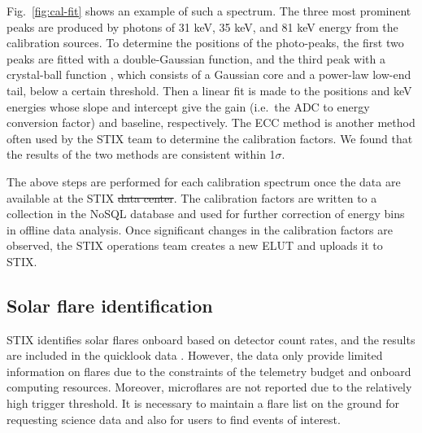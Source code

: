 \documentclass[referee]{aa} %
\providecommand{\DIFaddtex}[1]{{\protect\color{blue}\uwave{#1}}} %
\providecommand{\DIFdeltex}[1]{{\protect\color{red}\sout{#1}}}                      %
\providecommand{\DIFaddbegin}{} %
\providecommand{\DIFaddend}{} %
\providecommand{\DIFdelbegin}{} %
\providecommand{\DIFdelend}{} %
\providecommand{\DIFadd}[1]{\texorpdfstring{\DIFaddtex{#1}}{#1}} %
\providecommand{\DIFdel}[1]{\texorpdfstring{\DIFdeltex{#1}}{}} %
\newcommand{\DIFscaledelfig}{0.5}
\newlength{\DIFdelgraphicswidth} %
\newlength{\DIFdelgraphicsheight} %
\newcommand{\DIFaddincludegraphics}[2][]{{\color{blue}\fbox{\DIFOincludegraphics[#1]{#2}}}} %
\newcommand{\DIFdelincludegraphics}[2][]{%
\sbox{\DIFdelgraphicsbox}{\DIFOincludegraphics[#1]{#2}}%
\settoboxwidth{\DIFdelgraphicswidth}{\DIFdelgraphicsbox} %
\settoboxtotalheight{\DIFdelgraphicsheight}{\DIFdelgraphicsbox} %
\scalebox{\DIFscaledelfig}{%
\parbox[b]{\DIFdelgraphicswidth}{\usebox{\DIFdelgraphicsbox}\\[-\baselineskip] \rule{\DIFdelgraphicswidth}{0em}}\llap{\resizebox{\DIFdelgraphicswidth}{\DIFdelgraphicsheight}{%
\setlength{\unitlength}{\DIFdelgraphicswidth}%
\begin{picture}(1,1)%
\thicklines\linethickness{2pt} %
{\color[rgb]{1,0,0}\put(0,0){\framebox(1,1){}}}%
{\color[rgb]{1,0,0}\put(0,0){\line( 1,1){1}}}%
{\color[rgb]{1,0,0}\put(0,1){\line(1,-1){1}}}%
\end{picture}%
}\hspace*{3pt}}} %
} %
\DeclareRobustCommand{\DIFaddbegin}{\DIFOaddbegin \let\includegraphics\DIFaddincludegraphics} %
\DeclareRobustCommand{\DIFaddend}{\DIFOaddend \let\includegraphics\DIFOincludegraphics} %
\DeclareRobustCommand{\DIFdelbegin}{\DIFOdelbegin \let\includegraphics\DIFdelincludegraphics} %
\DeclareRobustCommand{\DIFdelend}{\DIFOaddend \let\includegraphics\DIFOincludegraphics} %
\begin{document}
Fig.~\ref{fig:cal-fit} shows an example of such a spectrum.  The three most prominent peaks are produced by photons of 31 keV, 35 keV, and 81 keV energy from the calibration sources. To determine the positions of the photo-peaks, the first two peaks are fitted with a double-Gaussian function, and the third peak with a crystal-ball function \citep{crsystallball},
which consists of a Gaussian core 
and a power-law low-end tail, below a certain threshold.
Then a linear fit is made to the positions and keV energies whose slope and intercept give the gain (i.e.\ the ADC to energy conversion factor) and baseline, respectively.
The ECC method \cite[see ][]{ecc,ecc2} is another method often used by the STIX team to determine the calibration factors.  We found that the results of the two methods are consistent within 1$\sigma$.

The above steps are performed for each calibration spectrum once the data are available at the STIX \DIFdelbegin \DIFdel{data center}\DIFdelend \DIFaddbegin \DIFadd{Data Center}\DIFaddend . 
The calibration factors are written to a collection in the NoSQL database and used for further correction of energy bins in offline data analysis.   
Once significant changes in the calibration factors are observed, the STIX operations team creates a new ELUT and uploads it to STIX.

\subsection{Solar flare identification}
STIX identifies solar flares onboard based on detector count rates, and the results are included in the quicklook data \citep{stix2020}.  However, the data only provide limited information on flares due to the constraints of the telemetry budget and onboard computing resources.  Moreover, microflares are not reported due to the relatively high trigger threshold.
It is necessary to maintain a flare list on the ground for requesting science data and also for users to find events of interest. 
\end{document}

